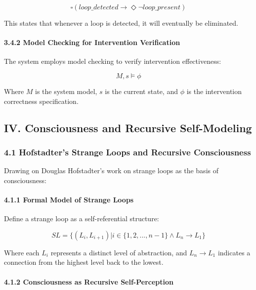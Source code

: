 \documentclass[
]{article}
\begin{document}
\[\square(loop\_detected \rightarrow \Diamond \neg loop\_present)\]

This states that whenever a loop is detected, it will eventually be
eliminated.

\paragraph{3.4.2 Model Checking for Intervention
Verification}\label{model-checking-for-intervention-verification}

The system employs model checking to verify intervention effectiveness:

\[M, s \models \phi\]

Where \(M\) is the system model, \(s\) is the current state, and
\(\phi\) is the intervention correctness specification.

\subsection{IV. Consciousness and Recursive
Self-Modeling}\label{iv.-consciousness-and-recursive-self-modeling}

\subsubsection{4.1 Hofstadter's Strange Loops and Recursive
Consciousness}\label{hofstadters-strange-loops-and-recursive-consciousness}

Drawing on Douglas Hofstadter's work on strange loops as the basis of
consciousness:

\paragraph{4.1.1 Formal Model of Strange
Loops}\label{formal-model-of-strange-loops}

Define a strange loop as a self-referential structure:

\[SL = \{(L_i, L_{i+1}) | i \in \{1,2,...,n-1\} \land L_n \rightarrow L_1\}\]

Where each \(L_i\) represents a distinct level of abstraction, and
\(L_n \rightarrow L_1\) indicates a connection from the highest level
back to the lowest.

\paragraph{4.1.2 Consciousness as Recursive
Self-Perception}\label{consciousness-as-recursive-self-perception}
\end{document}
